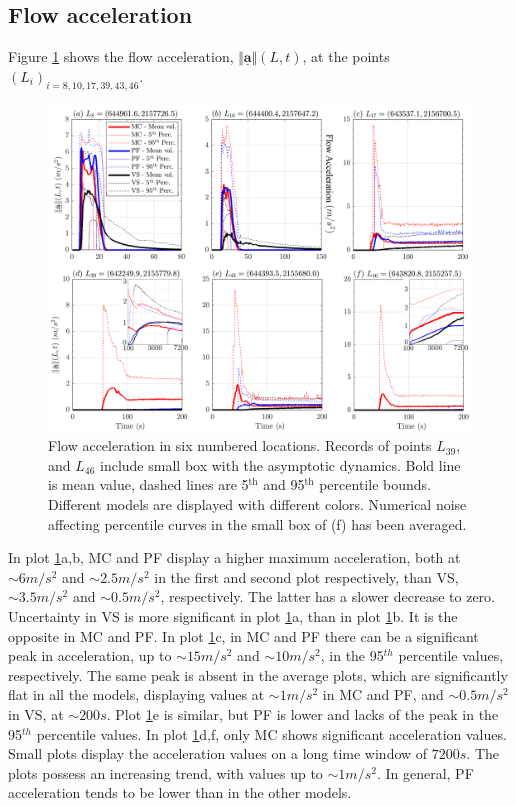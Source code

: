 \documentclass{article}
\begin{document}
\subsection{Flow acceleration}
Figure \ref{fig:Colima-Accel1} shows the flow acceleration, $\Vert \underline{\mathbf{a}} \Vert(L,t)$, at the points $(L_i)_{i=8,10,17,39,43,46}$.
\begin{figure}[H]
         \centering
        \includegraphics[width=1\textwidth]{ancFigs/Colima/Acceleration_BAF.png}
        \caption{Flow acceleration in six numbered locations. Records of points $L_{39}$, and $L_{46}$ include small box with the asymptotic dynamics. Bold line is mean value, dashed lines are 5$^{\mathrm{th}}$ and 95$^{\mathrm{th}}$ percentile bounds. Different models are displayed with different colors. Numerical noise affecting percentile curves in the small box of (f) has been averaged.}
        \label{fig:Colima-Accel1}
\end{figure}
In plot \ref{fig:Colima-Accel1}a,b, MC and PF display a higher maximum acceleration, both at $\sim 6 m/s^2$ and $\sim 2.5 m/s^2$ in the first and second plot respectively, than VS, $\sim 3.5 m/s^2$ and $\sim 0.5 m/s^2$, respectively. The latter has a slower decrease to zero. Uncertainty in VS is more significant in plot \ref{fig:Colima-Accel1}a, than in plot \ref{fig:Colima-Accel1}b. It is the opposite in MC and PF. In plot \ref{fig:Colima-Accel1}c, in MC and PF there can be a significant peak in acceleration, up to $\sim 15 m/s^2$ and $\sim 10 m/s^2$, in the 95$^{th}$ percentile values, respectively. The same peak is absent in the average plots, which are significantly flat in all the models, displaying values at $\sim 1 m/s^2$ in MC and PF, and $\sim 0.5 m/s^2$ in VS, at $\sim 200 s$. Plot \ref{fig:Colima-Accel1}e is similar, but PF is lower and lacks of the peak in the 95$^{th}$ percentile values. In plot \ref{fig:Colima-Accel1}d,f, only MC shows significant acceleration values. Small plots display the acceleration values on a long time window of $7200 s$. The plots possess an increasing trend, with values up to $\sim 1 m/s^2$. In general, PF acceleration tends to be lower than in the other models.
\newpage
\end{document}
